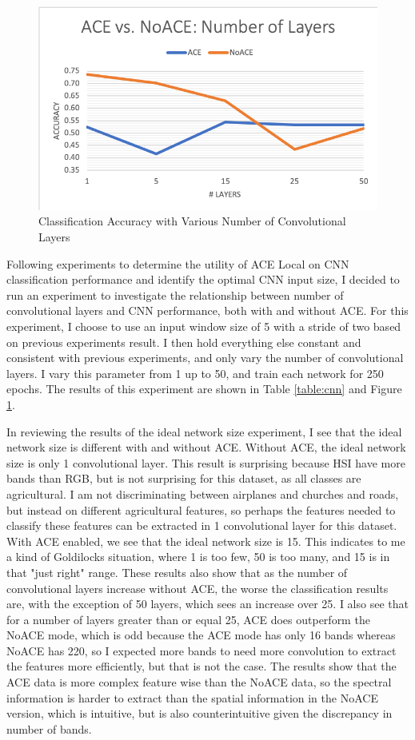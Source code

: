 \documentclass[12pt]{article}
\begin{document}
\begin{figure}[t]
	
	\centering
	\caption{Classification Accuracy with Various Number of Convolutional Layers}
	\label{figure:num-layers}
	
	\includegraphics[width=0.5\linewidth]{num-layers.png}
	
	
	
\end{figure}

Following experiments to determine the utility of ACE Local on CNN classification performance and identify the optimal CNN input size, I decided to run an experiment to investigate the relationship between number of convolutional layers and CNN performance, both with and without ACE.
%
For this experiment, I choose to use an input window size of 5 with a stride of two based on previous experiments result.
%
I then hold everything else constant and consistent with previous experiments, and only vary the number of convolutional layers.
%
I vary this parameter from 1 up to 50, and train each network for 250 epochs.
%
The results of this experiment are shown in Table \ref{table:cnn} and Figure \ref{figure:num-layers}.

In reviewing the results of the ideal network size experiment, I see that the ideal network size is different with and without ACE.
%
Without ACE, the ideal network size is only 1 convolutional layer.
%
This result is surprising because HSI have more bands than RGB, but is not surprising for this dataset, as all classes are agricultural. 
%
I am not discriminating between airplanes and churches and roads, but instead on different agricultural features, so perhaps the features needed to classify these features can be extracted in 1 convolutional layer for this dataset.
%
With ACE enabled, we see that the ideal network size is 15. 
%
This indicates to me a kind of Goldilocks situation, where 1 is too few, 50 is too many, and 15 is in that "just right" range. 
%
These results also show that as the number of convolutional layers increase without ACE, the worse the classification results are, with the exception of 50 layers, which sees an increase over 25.
%
I also see that for a number of layers greater than or equal 25, ACE does outperform the NoACE mode, which is odd because the ACE mode has only 16 bands whereas NoACE has 220, so I expected more bands to need more convolution to extract the features more efficiently, but that is not the case.
%
The results show that the ACE data is more complex feature wise than the NoACE data, so the spectral information is harder to extract than the spatial information in the NoACE version, which is intuitive, but is also counterintuitive given the discrepancy in number of bands.
\end{document}
